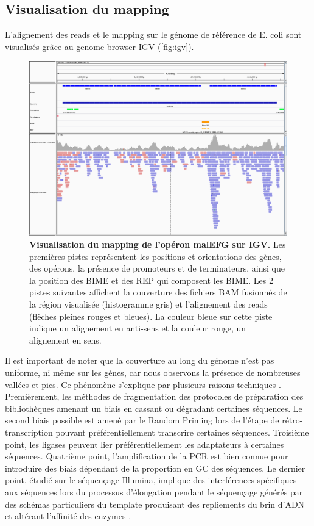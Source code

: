 \documentclass[12pt,a4paper]{report}
\begin{document}
\begin{onehalfspace}
\section*{Visualisation du mapping}
L'alignement des reads et le mapping sur le génome de référence de E. coli sont visualisés grâce au genome browser \href{https://www.broadinstitute.org/igv/}{IGV} (\autoref{fig:igv}).
\begin{figure}[ht]
\centerline{\includegraphics[scale=0.246]{figures/igv_snapshot.png}}
\caption{\textbf{Visualisation du mapping de l'opéron malEFG sur IGV.} Les premières pistes représentent les positions et orientations des gènes, des opérons, la présence de promoteurs et de terminateurs, ainsi que la position des BIME et des REP qui composent les BIME. Les 2 pistes suivantes affichent la couverture des fichiers BAM fusionnés de la région visualisée (histogramme gris) et l'alignement des reads (flèches pleines rouges et bleues). La couleur bleue sur cette piste indique un alignement en anti-sens et la couleur rouge, un alignement en sens.}
\label{fig:igv} 
\end{figure}

Il est important de noter que la couverture au long du génome n'est pas uniforme, ni même sur les gènes, car nous observons la présence de nombreuses vallées et pics. Ce phénomène s'explique par plusieurs raisons techniques \citep{Li2013}. Premièrement, les méthodes de fragmentation des protocoles de préparation des bibliothèques amenant un biais en cassant ou dégradant certaines séquences. Le second biais possible est amené par le Random Priming lors de l'étape de rétro-transcription pouvant préférentiellement transcrire certaines séquences. Troisième point, les ligases peuvent lier préférentiellement les adaptateurs à certaines séquences. Quatrième point, l'amplification de la PCR est bien connue pour introduire des biais dépendant de la proportion en GC des séquences. Le dernier point, étudié sur le séquençage Illumina, implique des interférences spécifiques aux séquences lors du processus d'élongation pendant le séquençage générés par des schémas particuliers du template produisant des repliements du brin d'ADN et altérant l'affinité des enzymes \citep{Nakamura2011}.


\end{onehalfspace}
\end{document}
